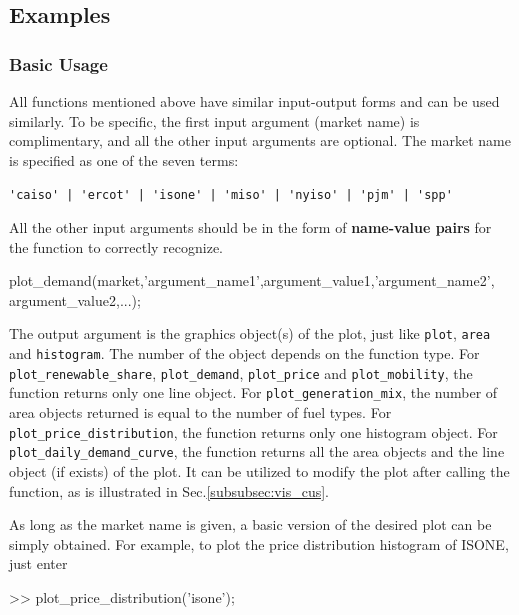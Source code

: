 \documentclass[10pt]{article}
\numberwithin{equation}{section}
\numberwithin{table}{section}
\numberwithin{figure}{section}
\begin{document}
\subsection{Examples}

\subsubsection{Basic Usage} \label{subsubsec:vis_basic}

All functions mentioned above have similar input-output forms and can be used similarly. To be specific, the first input argument (market name) is complimentary, and all the other input arguments are optional. The market name is specified as one of the seven terms:

\begin{center}
  \verb!'caiso' | 'ercot' | 'isone' | 'miso' | 'nyiso' | 'pjm' | 'spp'!
\end{center}

All the other input arguments should be in the form of \textbf{name-value pairs} for the function to correctly recognize.

\begin{Code}
plot_demand(market,'argument_name1',argument_value1,'argument_name2',
argument_value2,...);
\end{Code}

The output argument is the graphics object(s) of the plot, just like \verb!plot!, \verb!area! and \verb!histogram!. The number of the object depends on the function type. For \verb!plot_renewable_share!, \verb!plot_demand!, \verb!plot_price! and \verb!plot_mobility!, the function returns only one line object. For \verb!plot_generation_mix!, the number of area objects returned is equal to the number of fuel types. For \verb!plot_price_distribution!, the function returns only one histogram object. For \verb!plot_daily_demand_curve!, the function returns all the area objects and the line object (if exists) of the plot. It can be utilized to modify the plot after calling the function, as is illustrated in Sec.\ref{subsubsec:vis_cus}.

As long as the market name is given, a basic version of the desired plot can be simply obtained. For example, to plot the price distribution histogram of ISONE, just enter

\begin{Code}
>> plot_price_distribution('isone');
\end{Code}
\end{document}
